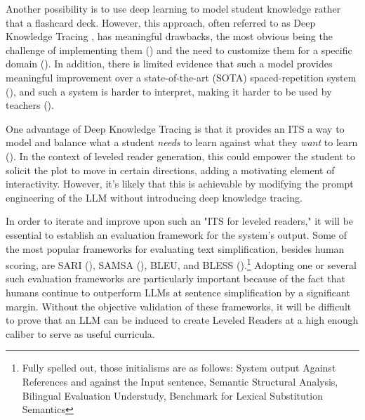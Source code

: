 \documentclass[
	letterpaper, %
]{jdf}
\newcommand{\pcite}[1]{(\cite{#1})}
\begin{document}
Another possibility is to use deep learning to model student knowledge rather that a flashcard deck. However, this approach, often referred to as Deep Knowledge Tracing \cite{deep_knowledge_tracing}, has meaningful drawbacks, the most obvious being the challenge of implementing them \pcite{question_generation_adaptive_education, generative_information_retrieval} and the need to customize them for a specific domain \pcite{dkt_knowledge_tracing}. In addition, there is limited evidence that such a model provides meaningful improvement over a state-of-the-art (SOTA) spaced-repetition system \pcite{flashcard_scheduler_evolution}, and such a system is harder to interpret, making it harder to be used by teachers \pcite{deep_learning_knowledge_tracing}.

One advantage of Deep Knowledge Tracing is that it provides an ITS a way to model and balance what a student \textit{needs} to learn against what they \textit{want} to learn \pcite{llm_augmented_exercise_retrieval}. In the context of leveled reader generation, this could empower the student to solicit the plot to move in certain directions, adding a motivating element of interactivity. However, it's likely that this is achievable by modifying the prompt engineering of the LLM without introducing deep knowledge tracing.

In order to iterate and improve upon such an "ITS for leveled readers," it will be essential to establish an evaluation framework for the system's output. Some of the most popular frameworks for evaluating text simplification, besides human scoring, are SARI \pcite{xu-etal-2016-optimizing}, SAMSA \pcite{sulem-etal-2018-semantic}, BLEU, and BLESS \pcite{kew2023bless}.\footnote{Fully spelled out, those initialisms are as follows: System output Against References and against the Input sentence, Semantic Structural Analysis, Bilingual Evaluation Understudy, Benchmark for Lexical Substitution Semantics} Adopting one or several such evaluation frameworks are particularly important because of the fact that humans continue to outperform LLMs at sentence simplification by a significant margin. Without the objective validation of these frameworks, it will be difficult to prove that an LLM can be induced to create Leveled Readers at a high enough caliber to serve as useful curricula.

\printbibliography{}
\end{document}
